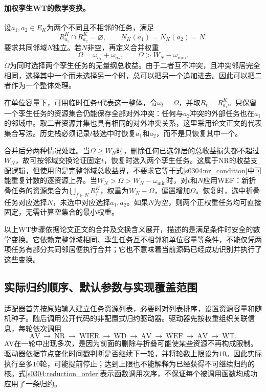 \paragraph{加权孪生WT的数学变换。}
设$a_1,a_2\in E_K$为两个不同且不相邻的任务，满足
\begin{equation}
 R_{a_1}^K\cap R_{a_2}^K=\varnothing,
 \qquad N_K(a_1)=N_K(a_2)=N.
 \label{s0304:wt_structure}
\end{equation}
要求共同邻域$N$独立。若$N$非空，再定义合并权重
\begin{equation}
 \Omega=\omega_{a_1}+\omega_{a_2},
 \qquad \Omega>W_N-\omega_{\min}.
 \label{s0304:wt_weight}
\end{equation}
$\Omega$为同时选择两个孪生任务的无量纲总收益。由于二者互不冲突，且冲突邻居完全相同，选择其中一个而未选择另一个时，总可以把另一个追加进去。因此可以把二者作为一个整体处理。

在单位容量下，可用临时任务$t$代表这一整体，令$\omega_t=\Omega$，并取$R_t=R_{a_1}^K$。只保留一个孪生任务的资源集合仍能保存全部对外冲突：任何与$a_2$冲突的外部任务也在$a_1$的邻域中。取二者资源并集也具有相同的对外冲突关系，这里采用论文正文的代表集合写法。历史栈必须记录$t$被选中时恢复$a_1$和$a_2$，而不是只恢复其中一个。

合并后分两种情况处理。当$\Omega\geq W_N$时，删除任何已选邻居的总收益损失都不超过$W_N$，故可按邻域交换论证固定$t$，恢复时选入两个孪生任务。这属于NR的收益支配逻辑，但使用的是完整邻域总收益界，不要求它等于式\eqref{s0304:nr_condition}中可能重复计数的逐资源上界。当$W_N>\Omega>W_N-\omega_{\min}$时，对$t$和$N$应用WEF：新折叠任务的资源集合为$\bigcup_{f\in N}R_f^K$，权重为$W_N-\Omega$，偏置增加$\Omega$。恢复时，选中折叠任务对应选择$N$，未选中对应选择$a_1,a_2$。如果$N$为空，则两个正权重任务均可直接固定，无需计算空集合的最小权重。

以上WT步骤依据论文正文的合并及交换含义展开，描述的是满足条件时安全的数学变换。它依赖完整邻域相同、孪生任务互不相邻和单位容量等条件，不能仅凭两项任务有部分共同邻居便执行合并；它也不意味着当前源码已经成功识别并执行了这些变换。

\subsection{实际归约顺序、默认参数与实现覆盖范围}

适配器首先按原始输入建立任务资源列表，必要时对列表排序，设置资源容量和随机种子。随后调用公开代码的非配置式归约驱动器。驱动器先按权重组织关联信息，每轮依次调用
\begin{equation}
 \mathrm{AV}\ \to\ \mathrm{NR}\ \to\ \mathrm{WIER}\ \to\ \mathrm{WD}
 \ \to\ \mathrm{AV}\ \to\ \mathrm{WEF}\ \to\ \mathrm{AV}\ \to\ \mathrm{WT}.
 \label{s0304:reduction_order}
\end{equation}
AV在一轮中出现多次，是因为前面的删除与折叠可能使某些资源不再构成限制。驱动器依据节点变化时间戳判断是否继续下一轮，并将轮数上限设为$10$。因此实际执行至多$10$轮，可能提前停止；达到上限也不能解释为已经获得不可继续归约的核。式\eqref{s0304:reduction_order}表示函数调用次序，不保证每个被调用函数均成功应用了一条归约。

